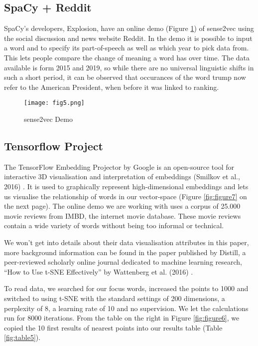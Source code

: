 \documentclass[12pt, usenames, dvipsnames]{report}
\begin{document}
\begin{flushleft}
\subsection{SpaCy + Reddit}

SpaCy’s developers, Explosion, have an online demo (Figure \ref{fig:figure5}) of sense2vec using the social discussion and news website Reddit.
In the demo it is possible to input a word and to specify its part-of-speech as well as which year to pick data from.
This lets people compare the change of meaning a word has over time.
The data available is form 2015 and 2019, so while there are no universal linguistic shifts in such a short period, it can be observed that occurances of the word trump now refer to the American President, when before it was linked to ranking.

\vspace*{1.2em}
\begin{figure}[!htbp]
  \hspace*{-3.666em}
  \texttt{[image: fig5.png]}
  \caption{sense2vec Demo}
  \label{fig:figure5}
\end{figure}
\vspace*{1.2em}

\subsection{Tensorflow Project}

The TensorFlow Embedding Projector by Google is an open-source tool for interactive 3D visualisation and interpretation of embeddings (Smilkov et al., 2016) \cite{smilkov2016}.
It is used to graphically represent high-dimensional embeddings and lets us visualise the relationship of words in our vector-space (Figure \ref{fig:figure7} on the next page).
The online demo we are working with uses a corpus of 25.000 movie reviews from IMBD, the internet movie database.
These movie reviews contain a wide variety of words without being too informal or technical.

We won’t get into details about their data visualisation attributes in this paper, more background information can be found in the paper published by Distill, a peer-reviewed scholarly online journal dedicated to machine learning research, “How to Use t-SNE Effectively” by Wattenberg et al. (2016) \cite{wattenberg2016}.

To read data, we searched for our focus words, increased the points to 1000 and switched to using t-SNE with the standard settings of 200 dimensions, a perplexity of 8, a learning rate of 10 and no supervision.
We let the calculations run for 8000 iterations.
From the table on the right in Figure \ref{fig:figure6}, we copied the 10 first results of nearest points into our results table (Table \ref{fig:table5}).


\end{flushleft}
\end{document}
